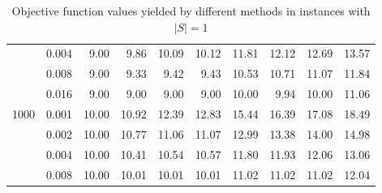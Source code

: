 \begin{table}[]
\begin{tabular}{rrrrrrrrrr}
& 0.004 & 9.00 & 9.86  & 10.09 & 10.12 & 11.81 & 12.12 & 12.69 & 13.57 \\
& 0.008 & 9.00 & 9.33  & 9.42  & 9.43  & 10.53 & 10.71 & 11.07 & 11.84 \\
& 0.016 & 9.00 & 9.00  & 9.00  & 9.00  & 10.00 & 9.94  & 10.00 & 11.06 \\
\hline
\multirow{5}{*}{1000} 
& 0.001 & 10.00 & 10.92 & 12.39 & 12.83 & 15.44 & 16.39 & 17.08 & 18.49 \\
& 0.002 & 10.00 & 10.77 & 11.06 & 11.07 & 12.99 & 13.38 & 14.00 & 14.98 \\
& 0.004 & 10.00 & 10.41 & 10.54 & 10.57 & 11.80 & 11.93 & 12.06 & 13.06 \\
& 0.008 & 10.00 & 10.01 & 10.01 & 10.01 & 11.02 & 11.02 & 11.02 & 12.04 \\
\end{tabular}
\caption{Objective function values yielded by different methods in instances with $|S|=1$}
\label{tab:obj-s1}
\end{table}

